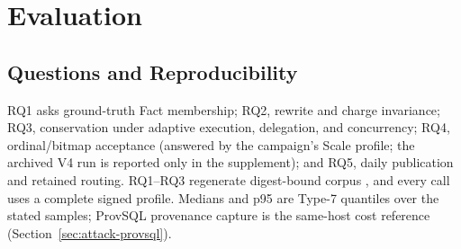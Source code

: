 \documentclass[10pt,journal,compsoc]{IEEEtran}
\begin{document}
\section{Evaluation}
\label{sec:evaluation}

\subsection{Questions and Reproducibility}

RQ1 asks ground-truth Fact membership; RQ2, rewrite and charge invariance;
RQ3, conservation under adaptive execution, delegation, and concurrency; RQ4,
ordinal/bitmap acceptance (answered by the campaign's Scale profile; the
archived V4 run is reported only in the supplement); and RQ5, daily
publication and retained routing.
RQ1--RQ3 regenerate digest-bound corpus \ExposureCorpusHash{}, and every call
uses a complete signed profile. Medians and p95 are Type-7
quantiles \cite{hyndman1996quantiles} over the stated samples; ProvSQL
provenance capture is the same-host cost reference
(Section~\ref{sec:attack-provsql}).
\end{document}

